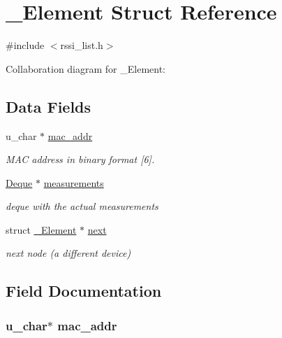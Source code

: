 \hypertarget{struct___element}{}\section{\+\_\+\+Element Struct Reference}
\label{struct___element}


{\ttfamily \#include $<$rssi\+\_\+list.\+h$>$}



Collaboration diagram for \+\_\+\+Element\+:
\subsection*{Data Fields}
\begin{DoxyCompactItemize}
\item 
u\+\_\+char $\ast$ \hyperlink{struct___element_ad700a49bff99a3ac02a5953416033472}{mac\+\_\+addr}
\begin{DoxyCompactList}\small\item\em M\+A\+C address in {\itshape binary} format \mbox{[}6\mbox{]}. \end{DoxyCompactList}\item 
\hyperlink{struct_deque}{Deque} $\ast$ \hyperlink{struct___element_a6b1eaa74e75a3aec587b2c7cdb72739f}{measurements}
\begin{DoxyCompactList}\small\item\em deque with the actual measurements \end{DoxyCompactList}\item 
struct \hyperlink{struct___element}{\+\_\+\+Element} $\ast$ \hyperlink{struct___element_a831a79730f61d73039284f439e1995ec}{next}
\begin{DoxyCompactList}\small\item\em next node (a different device) \end{DoxyCompactList}\end{DoxyCompactItemize}


\subsection{Field Documentation}
\hypertarget{struct___element_ad700a49bff99a3ac02a5953416033472}{}
\subsubsection[{mac\+\_\+addr}]{\setlength{\rightskip}{0pt plus 5cm}u\+\_\+char$\ast$ mac\+\_\+addr}\label{struct___element_ad700a49bff99a3ac02a5953416033472}


